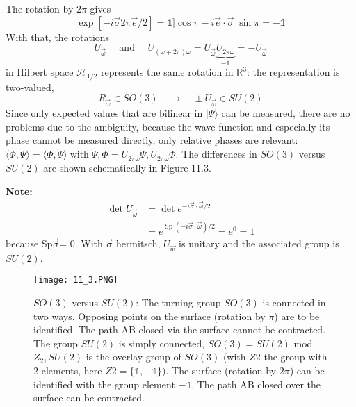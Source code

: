 The rotation by $2\pi$ gives
\begin{equation}
    \exp [-i \vec{\sigma} 2 \pi \vec{e} / 2]=\mathbb{1}] \cos \pi-i \vec{e} \cdot \vec{\sigma} \;\sin \pi=-\mathbb{1}
    \end{equation}
With that, the rotations
\begin{equation}
    U_{\vec{\omega}} \quad \text { and } \quad U_{(\omega+2 \pi) \hat{\omega}}=U_{\vec{\omega}} \underbrace{U_{2 \pi \hat{\omega}}}_{-\mathbb{1}}=-U_{\vec{\omega}}
    \end{equation}
in Hilbert space $\mathcal{H}_{1/2}$ represents the same rotation in $\mathbb{R}^3$: the representation is two-valued,
\begin{equation}
    R_{\vec{\omega}} \in S O(3) \quad \longrightarrow \quad \pm U_{\vec{\omega}} \in S U(2)
    \end{equation}
Since only expected values ​​that are bilinear in $|\Psi\rangle$ can be measured, there are no problems due to the ambiguity, because the wave function and especially its phase cannot be measured directly, only relative phases are relevant: $\langle\Phi, \Psi\rangle=\langle\widetilde{\Phi}, \widetilde{\Psi}\rangle \operatorname{with} \widetilde{\Psi}, \widetilde{\Phi}=U_{2 \pi \hat{\omega}} \Psi, U_{2 \pi \hat{\omega}} \Phi$. The differences in $SO (3)$ versus $SU (2)$ are shown schematically in Figure 11.3.\par
\textbf{Note:}
\begin{equation}
\begin{aligned} \operatorname{det} U_{\vec{\omega}} &=\operatorname{det} e^{-i \vec{\sigma} \cdot \vec{\omega} / 2} \\ &=e^{\operatorname{Sp}(-i \vec{\sigma} \cdot \vec{\omega}) / 2}=e^{0}=1 \end{aligned}
\end{equation}
because Sp$\vec{\sigma}$= 0. With $\vec{\sigma}$ hermitsch, $U_{\vec{w}}$ is unitary and the associated group is $SU (2)$.\par
\begin{figure}[ht]
        \centering
        \texttt{[image: 11\_3.PNG]}
        \caption{$SO (3)$ versus $SU (2)$: The turning group $SO (3)$ is connected in two ways. Opposing points on the surface (rotation by $\pi$) are to be identified. The path AB closed via the surface cannot be contracted. The group $SU (2)$ is simply connected, $SO (3) = SU (2)$ mod $Z_2, SU (2)$ is the overlay group of $SO (3)$ (with $Z2$ the group with 2 elements, here $Z2 = \{\mathbb{1} , −\mathbb{1}\})$. The surface (rotation by $2\pi$) can be identified with the group element $-\mathbb{1}$. The path AB closed over the surface can be contracted.}
\end{figure}
